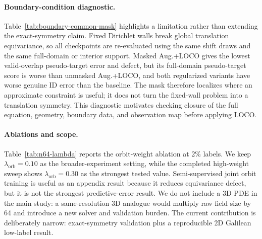 \paragraph{Boundary-condition diagnostic.} Table~\ref{tab:boundary-common-mask}
highlights a limitation rather than extending the exact-symmetry claim.  Fixed
Dirichlet walls break global translation equivariance, so all checkpoints are
re-evaluated using the same shift draws and the same full-domain or interior
support.  Masked Aug.+LOCO gives the lowest valid-overlap pseudo-target error and
defect, but its full-domain pseudo-target score is worse than unmasked Aug.+LOCO,
and both regularized variants have worse genuine ID error than the baseline.  The mask
therefore localizes where an approximate constraint is useful; it does not turn
the fixed-wall problem into a translation symmetry.  This diagnostic motivates
checking closure of the full equation, geometry, boundary data, and observation
map before applying LOCO.

\paragraph{Ablations and scope.} Table~\ref{tab:n64-lambda} reports the orbit-weight ablation at 2\% labels. We keep \(\lambda_{\mathrm{orb}}=0.10\) as the broader-experiment setting, while the completed high-weight sweep shows \(\lambda_{\mathrm{orb}}=0.30\) as the strongest tested value. Semi-supervised joint orbit training is useful as an appendix result because it reduces equivariance defect, but it is not the strongest predictive-error result. We do not include a 3D PDE in the main study: a same-resolution 3D analogue would multiply raw field size by 64 and introduce a new solver and validation burden. The current contribution is deliberately narrow: exact-symmetry validation plus a reproducible 2D Galilean low-label result.
